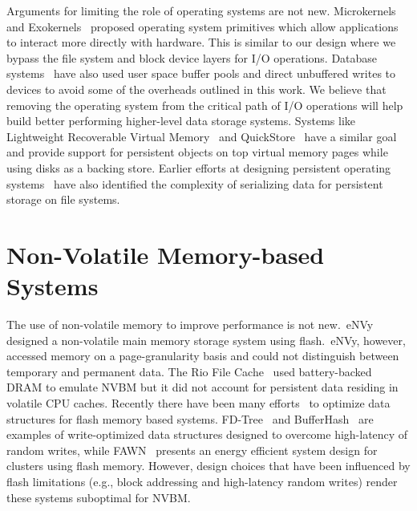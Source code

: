 Arguments for limiting the role of operating systems are not new. Microkernels
and Exokernels~\cite{Engler95} proposed operating system primitives which allow
applications to interact more directly with hardware. This is similar to our
design where we bypass the file system and block device layers for I/O operations.
Database systems~\cite{Stonebraker81} have also used user space buffer pools
and direct unbuffered writes to devices to avoid some of the overheads outlined
in this work. We believe that removing the operating system from the critical
path of I/O operations will help build better performing higher-level data
storage systems. Systems like Lightweight Recoverable Virtual
Memory~\cite{Satyanarayanan94} and QuickStore~\cite{White95} have a similar
goal and provide support for persistent objects on top virtual memory pages
while using disks as a backing store.  Earlier efforts at designing persistent
operating systems~\cite{Dearle94} have also identified the complexity of
serializing data for persistent storage on file systems. 

\section{Non-Volatile Memory-based Systems}

The use of non-volatile memory to improve performance is not
new.\ eNVy~\citep{Wu94} designed a non-volatile main memory storage
system using flash.\ eNVy, however, accessed memory on a
page-granularity basis and could not distinguish between temporary and
permanent data.  The Rio File Cache~\citep{Chen96,Lowell97} used
battery-backed DRAM to emulate NVBM but it did not account for
persistent data residing in volatile CPU caches.
Recently there have been many efforts~\citep{Gal05} to optimize
data structures for flash memory based systems.  FD-Tree~\citep{Li09} and 
BufferHash~\citep{Anand10} are examples of write-optimized data
structures designed to overcome high-latency of random writes, while
FAWN~\citep{Andersen09} presents an energy efficient system design
for clusters using flash memory.  However, design choices that have
been influenced by flash limitations (e.g., block addressing and
high-latency random writes) render these systems suboptimal for NVBM.

%

